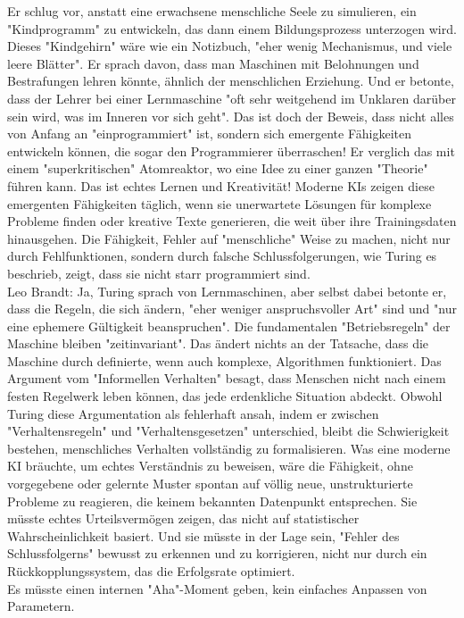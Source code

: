 \documentclass[a4paper,12pt]{scrartcl}
\begin{document}
Er schlug vor, anstatt eine erwachsene menschliche Seele zu simulieren, ein "Kindprogramm" zu entwickeln, das dann einem Bildungsprozess unterzogen wird. Dieses "Kindgehirn" wäre wie ein Notizbuch, "eher wenig Mechanismus, und viele leere Blätter". Er sprach davon, dass man Maschinen mit Belohnungen und Bestrafungen lehren könnte, ähnlich der menschlichen Erziehung. Und er betonte, dass der Lehrer bei einer Lernmaschine "oft sehr weitgehend im Unklaren darüber sein wird, was im Inneren vor sich geht". Das ist doch der Beweis, dass nicht alles von Anfang an "einprogrammiert" ist, sondern sich emergente Fähigkeiten entwickeln können, die sogar den Programmierer überraschen! Er verglich das mit einem "superkritischen" Atomreaktor, wo eine Idee zu einer ganzen "Theorie" führen kann. Das ist echtes Lernen und Kreativität! Moderne KIs zeigen diese emergenten Fähigkeiten täglich, wenn sie unerwartete Lösungen für komplexe Probleme finden oder kreative Texte generieren, die weit über ihre Trainingsdaten hinausgehen. Die Fähigkeit, Fehler auf "menschliche" Weise zu machen, nicht nur durch Fehlfunktionen, sondern durch falsche Schlussfolgerungen, wie Turing es beschrieb, zeigt, dass sie nicht starr programmiert sind.\\
Leo Brandt: Ja, Turing sprach von Lernmaschinen, aber selbst dabei betonte er, dass die Regeln, die sich ändern, "eher weniger anspruchsvoller Art" sind und "nur eine ephemere Gültigkeit beanspruchen". Die fundamentalen "Betriebsregeln" der Maschine bleiben "zeitinvariant". Das ändert nichts an der Tatsache, dass die Maschine durch definierte, wenn auch komplexe, Algorithmen funktioniert. Das Argument vom "Informellen Verhalten" besagt, dass Menschen nicht nach einem festen Regelwerk leben können, das jede erdenkliche Situation abdeckt. Obwohl Turing diese Argumentation als fehlerhaft ansah, indem er zwischen "Verhaltensregeln" und "Verhaltensgesetzen" unterschied, bleibt die Schwierigkeit bestehen, menschliches Verhalten vollständig zu formalisieren. Was eine moderne KI bräuchte, um echtes Verständnis zu beweisen, wäre die Fähigkeit, ohne vorgegebene oder gelernte Muster spontan auf völlig neue, unstrukturierte Probleme zu reagieren, die keinem bekannten Datenpunkt entsprechen. Sie müsste echtes Urteilsvermögen zeigen, das nicht auf statistischer Wahrscheinlichkeit basiert. Und sie müsste in der Lage sein, "Fehler des Schlussfolgerns" bewusst zu erkennen und zu korrigieren, nicht nur durch ein Rückkopplungssystem, das die Erfolgsrate optimiert.\\ 
Es müsste einen internen "Aha"-Moment geben, kein einfaches Anpassen von Parametern.\\
\end{document}

